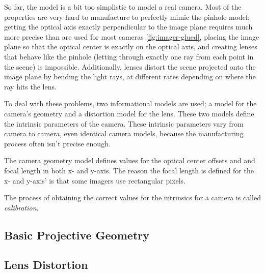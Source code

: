 So far, the model is a bit too simplistic to model a real camera. Most of the
properties are very hard to manufacture to perfectly mimic the pinhole model;
getting the optical axis exactly perpendicular to the image plane requires
much more precise than are used for most cameras \ref{fig:imager-glued},
placing the image plane so that the optical center is exactly on the optical
axis, and creating lenses that behave like the pinhole (letting through
exactly one ray from each point in the scene) is impossible. Additionally,
lenses distort the scene projected onto the image plane by bending the light
rays, at different rates depending on where the ray hits the lens.

To deal with these problems, two informational models are used; a model for
the camera's geometry and a distortion model for the lens. These two models
define the intrinsic parameters of the camera. These intrinsic parameters vary
from camera to camera, even identical camera models, because the manufacturing
process often isn't precise enough.

The camera geometry model defines values for the optical center offsets and
and focal length in both x- and y-axis. The reason the focal length is
defined for the x- and y-axis' is that some imagers use rectangular pixels.

The process of obtaining the correct values for the intrinsics for a camera is
called \emph{calibration}.

\subsection{Basic Projective Geometry}

\subsection{Lens Distortion}

